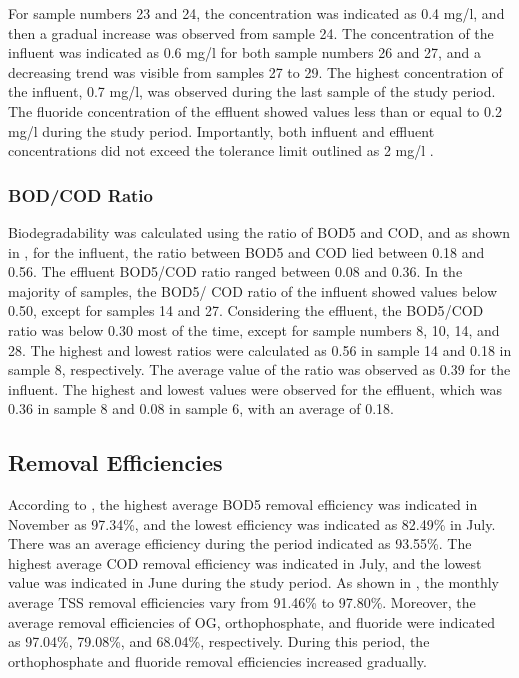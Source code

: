 For sample numbers 23 and 24, the concentration was indicated as 0.4 mg/l, and then a gradual increase was observed from sample 24. The concentration of the influent was indicated as 0.6 mg/l for both sample numbers 26 and 27, and a decreasing trend was visible from samples 27 to 29. The highest concentration of the influent, 0.7 mg/l, was observed during the last sample of the study period. The fluoride concentration of the effluent showed values less than or equal to 0.2 mg/l during the study period. Importantly, both influent and effluent concentrations did not exceed the tolerance limit outlined as 2 mg/l \cite{CEA2022}.





\subsubsection{BOD/COD Ratio}
Biodegradability was calculated using the ratio of \ac{BOD5} and \ac{COD}, and as shown in , for the influent, the ratio between \ac{BOD5} and \ac{COD} lied between 0.18 and 0.56. The effluent \ac{BOD5}/\ac{COD} ratio ranged between 0.08 and 0.36. In the majority of samples, the \ac{BOD5}/ \ac{COD} ratio of the influent showed values below 0.50, except for samples 14 and 27. Considering the effluent, the \ac{BOD5}/\ac{COD} ratio was below 0.30 most of the time, except for sample numbers 8, 10, 14, and 28. The highest and lowest ratios were calculated as 0.56 in sample 14 and 0.18 in sample 8, respectively. The average value of the ratio was observed as 0.39 for the influent. The highest and lowest values were observed for the effluent, which was 0.36 in sample 8 and 0.08 in sample 6, with an average of 0.18. 


\subsection{Removal Efficiencies}
According to , the highest average \ac{BOD5} removal efficiency was indicated in November as 97.34\%, and the lowest efficiency was indicated as 82.49\% in July. There was an average efficiency during the period indicated as 93.55\%. The highest average \ac{COD} removal efficiency was indicated in July, and the lowest value was indicated in June during the study period. As shown in , the monthly average \ac{TSS} removal efficiencies vary from 91.46\% to 97.80\%. Moreover, the average removal efficiencies of \ac{OG}, orthophosphate, and fluoride were indicated as 97.04\%, 79.08\%, and 68.04\%, respectively. During this period, the orthophosphate and fluoride removal efficiencies increased gradually.

